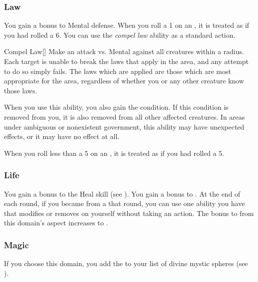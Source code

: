         \subsubsection{Law}
             You gain a  bonus to Mental defense.
             When you roll a 1 on an , it is treated as if you had rolled a 6.
             You can use the \textit{compel law} ability as a standard action.
            \begin{freeability}{Compel Law}[]
                Make an attack vs. Mental against all creatures within a \arealarge radius.
                \hit Each target is unable to break the laws that apply in the area, and any attempt to do so simply fails.
                The laws which are applied are those which are most appropriate for the area, regardless of whether you or any other creature know those laws.

                When you use this ability, you also gain the condition.
                If this condition is removed from you, it is also removed from all other affected creatures.
                In areas under ambiguous or nonexistent government, this ability may have unexpected effects, or it may have no effect at all.
            \end{freeability}
             When you roll less than a 5 on an , it is treated as if you had rolled a 5.

        \subsubsection{Life}
             You gain a  bonus to the Heal skill (see ).
             You gain a  bonus to .
             At the end of each round, if you became  from a  that round, you can use one  ability you have that modifies  or removes  on yourself without taking an action.
             The bonus to  from this domain's aspect increases to .

        \subsubsection{Magic}
            If you choose this domain, you add the   to your list of divine mystic spheres (see ).

